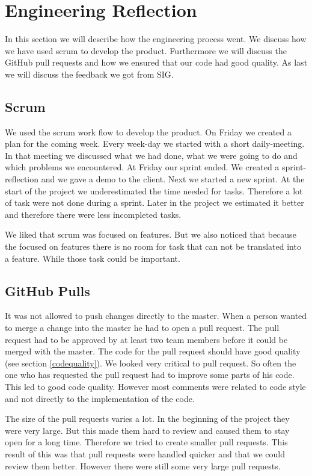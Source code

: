 \chapter{Engineering Reflection} %

In this section we will describe how the engineering process went. We discuss how we have used scrum to develop the product. Furthermore we will discuss the GitHub pull requests and how we ensured that our code had good quality. As last we will discuss the feedback we got from SIG.

\section{Scrum}
We used the scrum work flow to develop the product. On Friday we created a plan for the coming week. Every week-day we started with a short daily-meeting. In that meeting we discussed what we had done, what we were going to do and which problems we encountered. At Friday our sprint ended. We created a sprint-reflection and we gave a demo to the client. Next we started a new sprint. 
At the start of the project we underestimated the time needed for tasks. Therefore a lot of task were not done during a sprint. Later in the project we estimated it better and therefore there were less incompleted tasks.

We liked that scrum was focused on features. But we also noticed that because the focused on features there is no room for task that can not be translated into a feature. While those task could be important. 

\section{GitHub Pulls}
It was not allowed to push changes directly to the master. When a person wanted to merge a change into the master he had to open a pull request. The pull request had to be approved by at least two team members before it could be merged with the master. The code for the pull request should have good quality (see section \ref{codequality}).  We looked very critical to pull request. So often the one who has requested the pull request had to improve some parts of his code. This led to good code quality. However most comments were related to code style and not directly to the implementation of the code.

The size of the pull requests varies a lot. In the beginning of the project they were very large. But this made them hard to review and caused them to stay open for a long time. Therefore we tried to create smaller pull requests. This result of this was that pull requests were handled quicker and that we could review them better. However there were still some very large pull requests.

